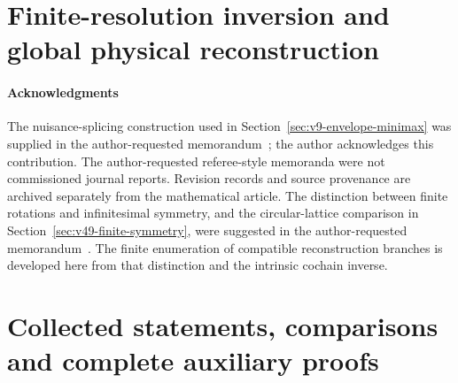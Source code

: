 \part{Finite-resolution inversion and global physical reconstruction}











\subsection*{Acknowledgments}
The nuisance-splicing construction used in
Section~\ref{sec:v9-envelope-minimax} was supplied in the
author-requested memorandum~\cite{A2ReviewV8}; the author acknowledges
this contribution.  The author-requested referee-style memoranda were
not commissioned journal reports.  Revision records and source
provenance are archived separately from the mathematical article.
The distinction between finite rotations and infinitesimal symmetry, and
the circular-lattice comparison in Section~\ref{sec:v49-finite-symmetry},
were suggested in the author-requested memorandum~\cite{A2ReviewV48}.
The finite enumeration of compatible reconstruction branches is developed
here from that distinction and the intrinsic cochain inverse.

\appendix
\renewcommand{\thesection}{A.\arabic{section}}
\renewcommand{\theHsection}{appendix.\arabic{section}}
\part{Collected statements, comparisons and complete auxiliary proofs}










